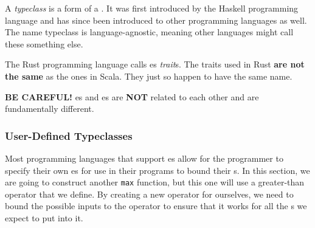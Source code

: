 \begin{definition}[Typeclass]\label{def:Typeclass}
  A \emph{typeclass} is a form of a .
  It was first introduced by the Haskell programming language and has since been introduced to other programming languages as well.
  The name typeclass is language-agnostic, meaning other languages might call these something else.
  
  \begin{remark}\label{rmk:Rust_Trait}
    The Rust programming language calls es \emph{trait}s.
    The traits used in Rust \textbf{are not the same} as the ones in Scala.
    They just so happen to have the same name.
  \end{remark}
  
  \begin{remark}
    \textbf{BE CAREFUL!}
    es and es are \textbf{NOT} related to each other and are fundamentally different.
  \end{remark}
\end{definition}

\subsubsection{User-Defined Typeclasses}\label{subsubsec:User_Defined_Typeclasses}
Most programming languages that support es allow for the programmer to specify their own es for use in their programs to bound their s.
In this section, we are going to construct another \texttt{max} function, but this one will use a greater-than operator that we define.
By creating a new operator for ourselves, we need to bound the possible inputs to the operator to ensure that it works for all the s we expect to put into it.

